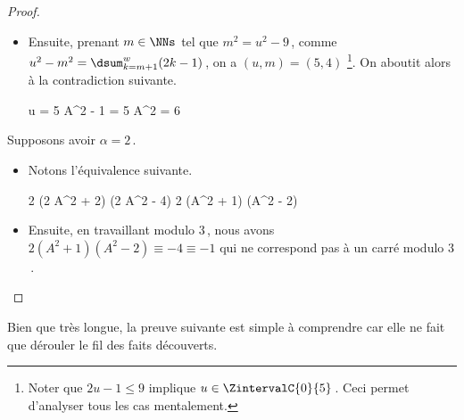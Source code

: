 \begin{proof}
\begin{itemize}
		\item Ensuite, prenant $m \in \NNs$ tel que $m^2 = u^2 - 9$\,, comme $u^2 - m^2 = \dsum_{k=m+1}^{w} (2 k - 1)$\,, on a $(u, m) = (5, 4)$
		\footnote{
			Noter que $2 u - 1 \leq 9$ implique $u \in \ZintervalC{0}{5}$\,. Ceci permet d'analyser tous les cas mentalement.
		}.
		On aboutit alors à la contradiction suivante.
        
        \medskip
        \noindent\kern-6pt%
        \begin{stepcalc}[style=ar*, ope=\iff]
        	u = 5
    	\explnext{}
        	A^2 - 1 = 5
        	A^2 = 6
        \end{stepcalc}
    \end{itemize}
    
    \medskip
    
    Supposons avoir $\alpha = 2$\,.
    
    \begin{itemize}
    	\item Notons l'équivalence suivante.
        
        \medskip
        \noindent\kern-6pt%
        \begin{stepcalc}[style=ar*, ope=\iff]
        	2 (2 A^2 + 2) (2 A^2 - 4) \in \NNssquare
        	2 (A^2 + 1) (A^2 - 2) \in \NNssquare
        \end{stepcalc}

		\item Ensuite, en travaillant modulo $3$\,, nous avons
		$2 (A^2 + 1) (A^2 - 2) \equiv -4 \equiv -1$ qui ne correspond pas à un carré modulo $3$\,.
		\qedhere 
    \end{itemize}   
\end{proof}





Bien que très longue, la preuve suivante est simple à comprendre car elle ne fait que dérouler le fil des faits découverts.

